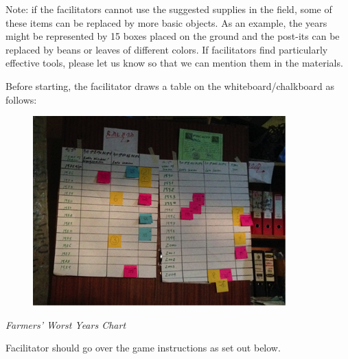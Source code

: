 \documentclass[letterpaper,10pt,english]{sphinxmanual}
\begin{document}
Note: if the facilitators cannot use the suggested supplies in the field, some of these items can be replaced by more basic objects. As an example, the years might be represented by 15 boxes placed on the ground and the post-its can be replaced by beans or leaves of different colors. If facilitators find particularly effective tools, please let us know so that we can mention them in the materials.

Before starting, the facilitator draws a table on the whiteboard/chalkboard as follows:
\begin{figure}[htbp]
\centering

\includegraphics{postitsInteractiveExercise.png}
\end{figure}

\emph{Farmers' Worst Years Chart}

Facilitator should go over the game instructions as set out below.
\end{document}

